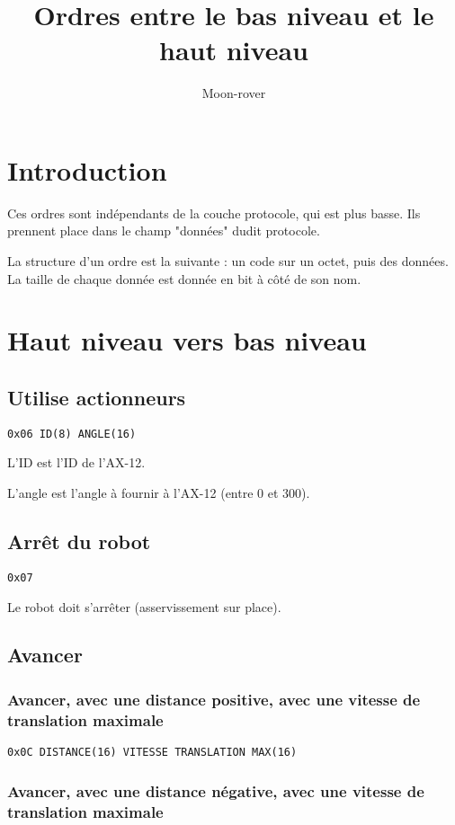 \documentclass[a4paper, 12pt]{article}
\title{Ordres entre le bas niveau et le haut niveau}
\author{Moon-rover}
\date{}
\begin{document}
\maketitle

\pagestyle{plain}

\tableofcontents


\section{Introduction}

Ces ordres sont indépendants de la couche protocole, qui est plus basse.
Ils prennent place dans le champ "données" dudit protocole.

La structure d'un ordre est la suivante : un code sur un octet, puis des données. La taille de chaque donnée est donnée en bit à côté de son nom.

\section{Haut niveau vers bas niveau}

\subsection{Utilise actionneurs}
\texttt{0x06 ID(8) ANGLE(16)}

L'ID est l'ID de l'AX-12.

L'angle est l'angle à fournir à l'AX-12 (entre 0 et 300).

\subsection{Arrêt du robot}
\texttt{0x07}
   
Le robot doit s'arrêter (asservissement sur place).

\subsection{Avancer}

\subsubsection{Avancer, avec une distance positive, avec une vitesse de translation maximale}
    \texttt{0x0C DISTANCE(16) VITESSE  TRANSLATION  MAX(16)}

\subsubsection{Avancer, avec une distance négative, avec une vitesse de translation maximale}
\end{document}
